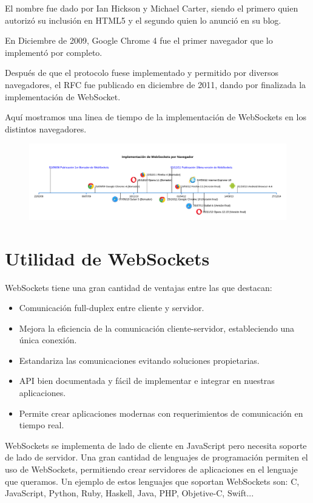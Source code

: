 \documentclass[12pt,a4paper]{article}
\begin{document}
​El nombre fue dado por Ian Hickson y Michael Carter, siendo el primero quien autorizó su inclusión en HTML5 y el segundo quien lo anunció en su blog.

​En Diciembre de 2009, Google Chrome 4 fue el primer navegador que lo implementó por completo. 

​Después de que el protocolo fuese implementado y permitido por diversos navegadores, el RFC fue publicado en diciembre de 2011, dando por finalizada la implementación de WebSocket.

Aquí mostramos una linea de tiempo de la implementación de WebSockets en los distintos navegadores.

\begin{figure}[H]
\centering
\includegraphics[scale=0.55]{imagenes/timeline.pdf}
\end{figure}

\section{Utilidad de WebSockets}


WebSockets tiene una gran cantidad de ventajas entre las que destacan:
\begin{itemize}
\item Comunicación full-duplex entre cliente y servidor.
\item Mejora la eficiencia de la comunicación cliente-servidor, estableciendo una única conexión.
\item Estandariza las comunicaciones evitando soluciones propietarias.
\item API bien documentada y fácil de implementar e integrar en nuestras aplicaciones.
\item Permite crear aplicaciones modernas con requerimientos de comunicación en tiempo real.
	
\end{itemize}

WebSockets se implementa de lado de cliente en JavaScript pero necesita soporte de lado de servidor. Una gran cantidad de lenguajes de programación permiten el uso de WebSockets, permitiendo crear servidores de aplicaciones en el lenguaje que queramos. Un ejemplo de estos lenguajes que soportan WebSockets son: C, JavaScript, Python, Ruby, Haskell, Java, PHP, Objetive-C, Swift...
\end{document}
